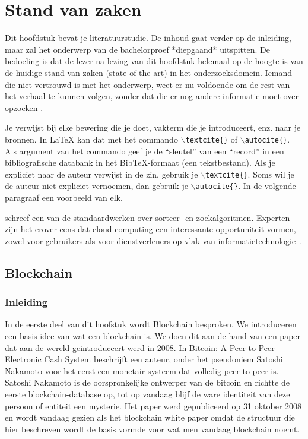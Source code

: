 \chapter{Stand van zaken}
\label{ch:stand-van-zaken}



Dit hoofdstuk bevat je literatuurstudie. De inhoud gaat verder op de inleiding, maar zal het onderwerp van de bachelorproef *diepgaand* uitspitten. De bedoeling is dat de lezer na lezing van dit hoofdstuk helemaal op de hoogte is van de huidige stand van zaken (state-of-the-art) in het onderzoeksdomein. Iemand die niet vertrouwd is met het onderwerp, weet er nu voldoende om de rest van het verhaal te kunnen volgen, zonder dat die er nog andere informatie moet over opzoeken \autocite{Pollefliet2011}.

Je verwijst bij elke bewering die je doet, vakterm die je introduceert, enz. naar je bronnen. In \LaTeX{} kan dat met het commando \texttt{$\backslash${textcite\{\}}} of \texttt{$\backslash${autocite\{\}}}. Als argument van het commando geef je de ``sleutel'' van een ``record'' in een bibliografische databank in het Bib\TeX{}-formaat (een tekstbestand). Als je expliciet naar de auteur verwijst in de zin, gebruik je \texttt{$\backslash${}textcite\{\}}.
Soms wil je de auteur niet expliciet vernoemen, dan gebruik je \texttt{$\backslash${}autocite\{\}}. In de volgende paragraaf een voorbeeld van elk.

\textcite{Knuth1998} schreef een van de standaardwerken over sorteer- en zoekalgoritmen. Experten zijn het erover eens dat cloud computing een interessante opportuniteit vormen, zowel voor gebruikers als voor dienstverleners op vlak van informatietechnologie~\autocite{Creeger2009}.
\newpage
\section{Blockchain}
\label{sec:blockchain}
	\subsection*{Inleiding}
	In de eerste deel van dit hoofstuk wordt  Blockchain besproken. We introduceren een basis-idee van wat een blockchain is. We doen dit aan de hand van een paper dat aan de wereld geintroduceert werd in 2008. In Bitcoin: A Peer-to-Peer Electronic Cash System beschrijft een auteur, onder het pseudoniem Satoshi Nakamoto voor het eerst een monetair systeem dat volledig peer-to-peer is. Satoshi Nakamoto is de oorspronkelijke ontwerper van de bitcoin en richtte de eerste blockchain-database op, tot op vandaag blijf de ware identiteit van deze persoon of entiteit een mysterie. Het paper werd gepubliceerd op 31 oktober 2008 en wordt vandaag gezien als het blockchain white paper omdat de structuur die hier beschreven wordt de basis vormde voor wat men vandaag blockchain noemt.
